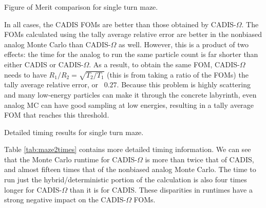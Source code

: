 \begin{table}[h!]
  \centering
  
  \caption[Figure of Merit comparison for single turn maze.]{Figure of Merit
    comparison for single turn maze.}
  \label{tab:maze2foms}
\end{table}

In all cases, the
CADIS FOMs are better than those obtained by CADIS-$\Omega$. The FOMs
calculated using the tally average relative error are better in the nonbiased
analog Monte Carlo than CADIS-$\Omega$ as well. However, this is a product of
two effects: the time for the analog to run the same particle count is far
shorter than either CADIS or CADIS-$\Omega$. As a result, to obtain the same
FOM, CADIS-$\Omega$ needs to have $R_1/R_2 = \sqrt{T_2/T_1}$ (this is from
taking a ratio of the FOMs) the tally average
relative error, or ~$0.27$. 
Because this problem is highly scattering and many
low-energy particles can make it through the concrete labyrinth, even analog MC
can have good sampling at low energies, resulting in a tally average FOM that
reaches this threshold.

\begin{table}[h!]
  \centering
  
  \caption[Detailed timing results for single turn maze.]
  {Detailed timing results for single turn maze.}
  \label{tab:maze2times}
\end{table}

Table \ref{tab:maze2times} contains more detailed timing information. 
We can see that the Monte Carlo
runtime for CADIS-$\Omega$ is more than twice that of CADIS, and almost fifteen
times that of the nonbiased analog Monte Carlo. The time to run just the
hybrid/deterministic portion of the calculation is also four times longer for
CADIS-$\Omega$ than it is for CADIS. These disparities in runtimes have a strong
negative impact on the CADIS-$\Omega$ FOMs.

